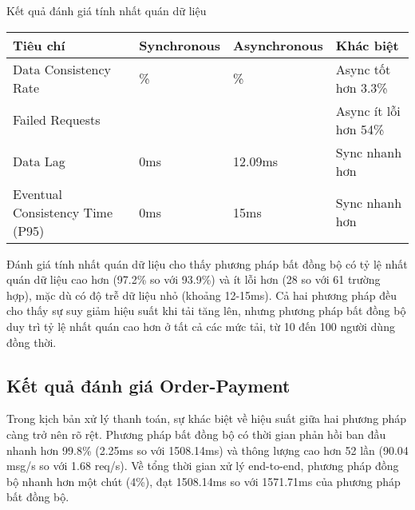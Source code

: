 \begin{table}[h]{Kết quả đánh giá tính nhất quán dữ liệu}
    \centering
    {\setlength{\arrayrulewidth}{1pt}
        \renewcommand{\arraystretch}{1.5}
        \setlength{\tabcolsep}{6pt}
        \begin{tabular}{|>{\raggedright\arraybackslash}p{3.2cm}|>{\raggedright\arraybackslash}p{3.2cm}|>{\raggedright\arraybackslash}p{3.2cm}|>{\raggedright\arraybackslash}p{3.2cm}|}
            \hline
            \textbf{Tiêu chí}               & \textbf{Synchronous} & \textbf{Asynchronous} & \textbf{Khác biệt}    \\
            \hline
            Data Consistency Rate           & 93.9\%               & 97.2\%                & Async tốt hơn 3.3\%   \\
            \hline
            Failed Requests                 & 61                   & 28                    & Async ít lỗi hơn 54\% \\
            \hline
            Data Lag                        & 0ms                  & 12.09ms               & Sync nhanh hơn        \\
            \hline
            Eventual Consistency Time (P95) & 0ms                  & 15ms                  & Sync nhanh hơn        \\
            \hline
        \end{tabular}}
\end{table}

Đánh giá tính nhất quán dữ liệu cho thấy phương pháp bất đồng bộ có tỷ lệ nhất quán dữ liệu cao hơn (97.2\% so với 93.9\%) và ít lỗi hơn (28 so với 61 trường hợp), mặc dù có độ trễ dữ liệu nhỏ (khoảng 12-15ms). Cả hai phương pháp đều cho thấy sự suy giảm hiệu suất khi tải tăng lên, nhưng phương pháp bất đồng bộ duy trì tỷ lệ nhất quán cao hơn ở tất cả các mức tải, từ 10 đến 100 người dùng đồng thời.

\subsection{Kết quả đánh giá Order-Payment}
Trong kịch bản xử lý thanh toán, sự khác biệt về hiệu suất giữa hai phương pháp càng trở nên rõ rệt. Phương pháp bất đồng bộ có thời gian phản hồi ban đầu nhanh hơn 99.8\% (2.25ms so với 1508.14ms) và thông lượng cao hơn 52 lần (90.04 msg/s so với 1.68 req/s). Về tổng thời gian xử lý end-to-end, phương pháp đồng bộ nhanh hơn một chút (4\%), đạt 1508.14ms so với 1571.71ms của phương pháp bất đồng bộ.


